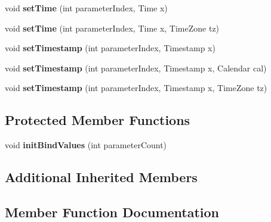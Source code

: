 \begin{DoxyCompactItemize}
void {\bfseries set\+Time} (int parameter\+Index, Time x)
\item 
\mbox{\label{classcom_1_1mysql_1_1cj_1_1_server_prepared_query_bindings_a0ad6b210931aaf77c8038142968b3f54}} 
void {\bfseries set\+Time} (int parameter\+Index, Time x, Time\+Zone tz)
\item 
\mbox{\label{classcom_1_1mysql_1_1cj_1_1_server_prepared_query_bindings_a163546356d456fa9ebeea955ec61ad35}} 
void {\bfseries set\+Timestamp} (int parameter\+Index, Timestamp x)
\item 
\mbox{\label{classcom_1_1mysql_1_1cj_1_1_server_prepared_query_bindings_a8483a3d5f6743cb4e6b678c407e2a7a0}} 
void {\bfseries set\+Timestamp} (int parameter\+Index, Timestamp x, Calendar cal)
\item 
\mbox{\label{classcom_1_1mysql_1_1cj_1_1_server_prepared_query_bindings_a01f10892a7da4f61c5b91958ac6d57b2}} 
void {\bfseries set\+Timestamp} (int parameter\+Index, Timestamp x, Time\+Zone tz)
\end{DoxyCompactItemize}
\subsection*{Protected Member Functions}
\begin{DoxyCompactItemize}
\item 
\mbox{\label{classcom_1_1mysql_1_1cj_1_1_server_prepared_query_bindings_ae502eedc58e9ab3740bcae8c62e09cc6}} 
void {\bfseries init\+Bind\+Values} (int parameter\+Count)
\end{DoxyCompactItemize}
\subsection*{Additional Inherited Members}


\subsection{Member Function Documentation}
\mbox{\label{classcom_1_1mysql_1_1cj_1_1_server_prepared_query_bindings_a15f0b3974435b3e95fcbbe4a050fb5d6}} 
